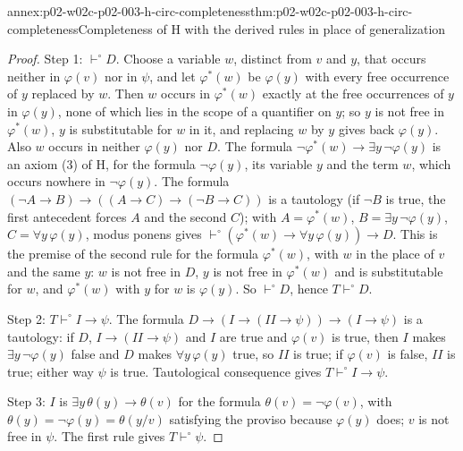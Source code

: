 \begin{annexitem}{annex:p02-w02c-p02-003-h-circ-completeness}{thm:p02-w02c-p02-003-h-circ-completeness}{Completeness of H with the derived rules in place of generalization}
\begin{proof}
Step 1: \(\vdash^{\circ}D\).  Choose a variable \(w\), distinct from \(v\)
and \(y\), that occurs neither in \(\varphi(v)\) nor in \(\psi\), and let
\(\varphi^{*}(w)\) be \(\varphi(y)\) with every free occurrence of \(y\)
replaced by \(w\).  Then \(w\) occurs in \(\varphi^{*}(w)\) exactly at the
free occurrences of \(y\) in \(\varphi(y)\), none of which lies in the
scope of a quantifier on \(y\); so \(y\) is not free in \(\varphi^{*}(w)\),
\(y\) is substitutable for \(w\) in it, and replacing \(w\) by \(y\) gives
back \(\varphi(y)\).  Also \(w\) occurs in neither \(\varphi(y)\) nor
\(D\).  The formula \(\neg\varphi^{*}(w)\to\exists y\,\neg\varphi(y)\) is
an axiom (3) of H, for the formula \(\neg\varphi(y)\), its variable \(y\)
and the term \(w\), which occurs nowhere in \(\neg\varphi(y)\).  The
formula \((\neg A\to B)\to((A\to C)\to(\neg B\to C))\) is a tautology
(if \(\neg B\) is true, the first antecedent forces \(A\) and the second
\(C\)); with \(A=\varphi^{*}(w)\), \(B=\exists y\,\neg\varphi(y)\),
\(C=\forall y\,\varphi(y)\), modus ponens gives
\(\vdash^{\circ}(\varphi^{*}(w)\to\forall y\,\varphi(y))\to D\).  This is
the premise of the second rule for the formula \(\varphi^{*}(w)\), with
\(w\) in the place of \(v\) and the same \(y\): \(w\) is not free in \(D\),
\(y\) is not free in \(\varphi^{*}(w)\) and is substitutable for \(w\), and
\(\varphi^{*}(w)\) with \(y\) for \(w\) is \(\varphi(y)\).  So
\(\vdash^{\circ}D\), hence \(T\vdash^{\circ}D\).

Step 2: \(T\vdash^{\circ}I\to\psi\).  The formula
\(D\to(I\to(I\!I\to\psi))\to(I\to\psi)\) is a tautology: if \(D\),
\(I\to(I\!I\to\psi)\) and \(I\) are true and \(\varphi(v)\) is true, then
\(I\) makes \(\exists y\,\neg\varphi(y)\) false and \(D\) makes
\(\forall y\,\varphi(y)\) true, so \(I\!I\) is true; if \(\varphi(v)\) is
false, \(I\!I\) is true; either way \(\psi\) is true.  Tautological
consequence gives \(T\vdash^{\circ}I\to\psi\).

Step 3: \(I\) is \(\exists y\,\theta(y)\to\theta(v)\) for the formula
\(\theta(v)=\neg\varphi(v)\), with \(\theta(y)=\neg\varphi(y)=\theta(y/v)\)
satisfying the proviso because \(\varphi(y)\) does; \(v\) is not free in
\(\psi\).  The first rule gives \(T\vdash^{\circ}\psi\).


\end{proof}
\end{annexitem}
